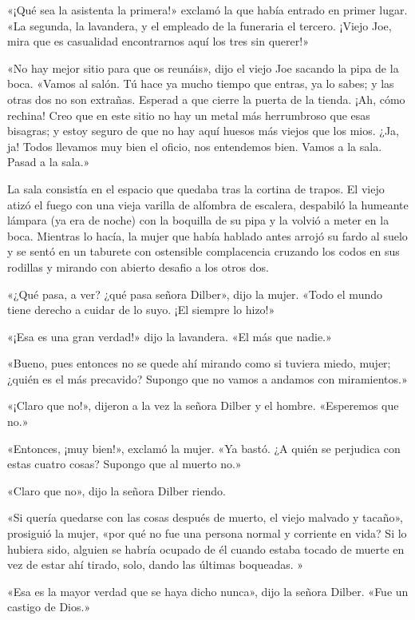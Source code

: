 \documentclass{novela}
\begin{document}
 «¡Qué sea la asistenta la primera!» exclamó la que había entrado en primer lugar. «La segunda, la lavandera, y el empleado de la funeraria el tercero. ¡Viejo Joe, mira que es casualidad encontrarnos aquí los tres sin querer!»

 «No hay mejor sitio para que os reunáis», dijo el viejo Joe sacando la pipa de la boca. «Vamos al salón. Tú hace ya mucho tiempo que entras, ya lo sabes; y las otras dos no son extrañas. Esperad a que cierre la puerta de la tienda. ¡Ah, cómo rechina! Creo que en este sitio no hay un metal más herrumbroso que esas bisagras; y estoy seguro de que no hay aquí huesos más viejos que los mios. ¿Ja, ja! Todos llevamos muy bien el oficio, nos entendemos bien. Vamos a la sala. Pasad a la sala.»

 La sala consistía en el espacio que quedaba tras la cortina de trapos. El viejo atizó el fuego con una vieja varilla de alfombra de escalera, despabiló la humeante lámpara (ya era de noche) con la boquilla de su pipa y la volvió a meter en la boca. Mientras lo hacía, la mujer que había hablado antes arrojó su fardo al suelo y se sentó en un taburete con ostensible complacencia cruzando los codos en sus rodillas y mirando con abierto desafio a los otros dos.

 «¿Qué pasa, a ver? ¿qué pasa señora Dilber», dijo la mujer. «Todo el mundo tiene derecho a cuidar de lo suyo. ¡El siempre lo hizo!»

 «¡Esa es una gran verdad!» dijo la lavandera. «El más que nadie.»

 «Bueno, pues entonces no se quede ahí mirando como si tuviera miedo, mujer; ¿quién es el más precavido? Supongo que no vamos a andamos con miramientos.»

 «¡Claro que no!», dijeron a la vez la señora Dilber y el hombre. «Esperemos que no.»

 «Entonces, ¡muy bien!», exclamó la mujer. «Ya bastó. ¿A quién se perjudica con estas cuatro cosas? Supongo que al muerto no.»

 «Claro que no», dijo la señora Dilber riendo.

 «Si quería quedarse con las cosas después de muerto, el viejo malvado y tacaño», prosiguió la mujer, «por qué no fue una persona normal y corriente en vida? Si lo hubiera sido, alguien se habría ocupado de él cuando estaba tocado de muerte en vez de estar ahí tirado, solo, dando las últimas boqueadas. »

 «Esa es la mayor verdad que se haya dicho nunca», dijo la señora Dilber. «Fue un castigo de Dios.»
\end{document}
